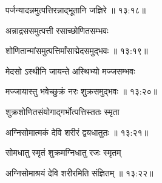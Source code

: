 
{\devanagarifont पर्जन्यादन्नमुत्पत्तिरन्नाद्भूतानि जज्ञिरे {॥ १३:१८॥} \veg\dontdisplaylinenum }%

{\devanagarifont अन्नाद्रससमुत्पत्ती रसाच्छोणितसम्भवः \thinspace{\dandab} \dontdisplaylinenum }%


{\devanagarifont शोणितान्मांसमुत्पत्तिर्मांसाद्मेदसमुद्भवः {॥ १३:१९॥} \veg\dontdisplaylinenum }%

{\devanagarifont मेदसो ऽस्थीनि जायन्ते अस्थिभ्यो मज्जसम्भवः \thinspace{\dandab} \dontdisplaylinenum }%
 

{\devanagarifont मज्जायास्तु भवेच्छुक्रं नरः शुक्रसमुद्भवः {॥ १३:२०॥} \veg\dontdisplaylinenum }%

{\devanagarifont शुक्रशोणितसंयोगाद्गर्भोत्पत्तिस्ततः स्मृता \thinspace{\dandab} \dontdisplaylinenum }%


{\devanagarifont अग्निसोमात्मकं देवि शरीरं द्वयधातुतः {॥ १३:२१॥} \veg\dontdisplaylinenum }%

{\devanagarifont सोमधातु स्मृतं शुक्रमग्निधातु रजः स्मृतम् \thinspace{\dandab} \dontdisplaylinenum }%


{\devanagarifont अग्निसोमाश्रयं देवि शरीरमिति संज्ञितम् {॥ १३:२२॥} \veg\dontdisplaylinenum }%

